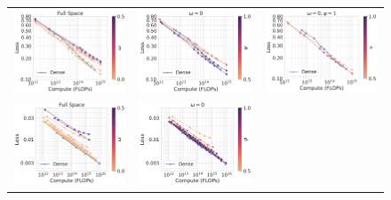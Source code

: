 \documentclass{article}
\begin{document}
\begin{figure}[!t]
\centering
    \begin{tabular}{ccc}
    \hspace{-4mm}
    \includegraphics[height=0.27\linewidth]{figs/rebuttal/c5m/omega.pdf} &
    \hspace{-5mm}
    \includegraphics[height=0.27\linewidth, trim=3cm 0cm 0cm 0cm, clip]{figs/rebuttal/c5m/psi.pdf} &
    \hspace{-5mm}
    \includegraphics[height=0.27\linewidth, trim=3cm 0cm 0cm 0cm, clip]{figs/rebuttal/c5m/nu.pdf} \\
    \includegraphics[height=0.28\linewidth]{figs/rebuttal/mlp/omega.pdf} &
    \hspace{-5mm}
    \includegraphics[height=0.28\linewidth, trim=3.5cm 0cm 0cm 0cm, clip]{figs/rebuttal/mlp/psi.pdf} &

\end{tabular}
\end{figure}
\end{document}
